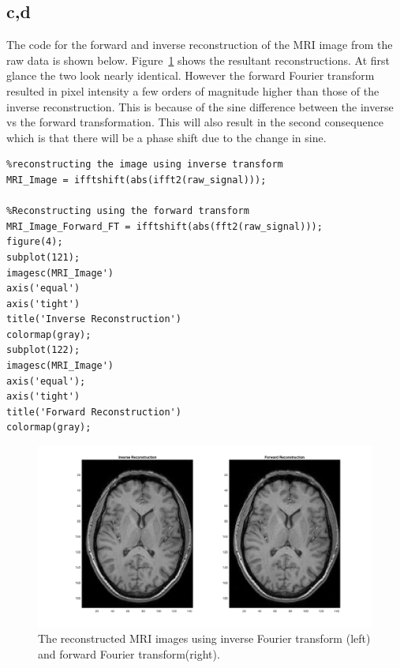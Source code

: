\documentclass[12pt]{article}
\begin{document}
\subsection{c,d}
The code for the forward and inverse reconstruction of the MRI image from the raw data is shown below. Figure~\ref{Fig:invFwd} shows the resultant reconstructions. At first glance the two look nearly identical. However the forward Fourier transform resulted in pixel intensity a few orders of magnitude higher than those of the inverse reconstruction. This is because of the sine difference between the inverse vs the forward transformation. This will also result in the second consequence which is that there will be a phase shift due to the change in sine.

\begin{lstlisting}[style=Matlab-editor]
%%
%reconstructing the image using inverse transform
MRI_Image = ifftshift(abs(ifft2(raw_signal)));

%Reconstructing using the forward transform
MRI_Image_Forward_FT = ifftshift(abs(fft2(raw_signal)));
figure(4);
subplot(121);
imagesc(MRI_Image')
axis('equal')
axis('tight')
title('Inverse Reconstruction')
colormap(gray);
subplot(122);
imagesc(MRI_Image')
axis('equal');
axis('tight')
title('Forward Reconstruction')
colormap(gray);

\end{lstlisting}
\begin{figure}[h]
	\centering
	\includegraphics[width=\textwidth]{Figures/fwdVSinv.png}
	\caption{The reconstructed MRI images using inverse Fourier transform (left) and forward Fourier transform(right).}
	\label{Fig:invFwd}
\end{figure}
\vspace{-.3in}
\end{document}
